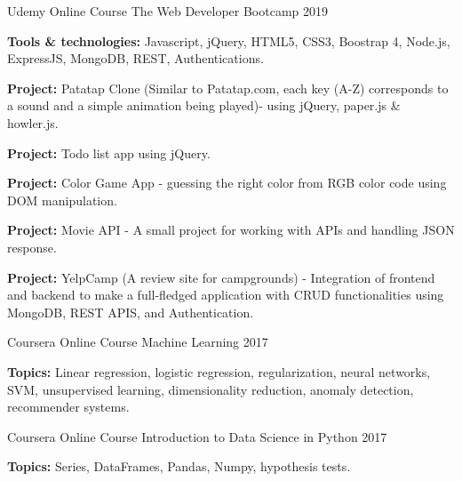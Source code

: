 


\begin{cventries}

\cventry
{Udemy Online Course} %
{The Web Developer Bootcamp} %
{} %
{2019} %
{ %
\begin{cvitems}
\item {\textbf{Tools \& technologies:} Javascript, jQuery, HTML5, CSS3, Boostrap 4, Node.js, ExpressJS, MongoDB, REST, Authentications. }
\item {\textbf{Project:} Patatap Clone (Similar to Patatap.com, each key (A-Z) corresponds to a sound and a simple animation being played)- using jQuery, paper.js \& howler.js.}
\item{\textbf{Project:} Todo list app using jQuery.}
\item{\textbf{Project:} Color Game App - guessing the right color from RGB color code using DOM manipulation.}
\item{\textbf{Project:} Movie API - A small project for working with APIs and handling JSON response.}
\item{\textbf{Project:} YelpCamp (A review site for campgrounds) - Integration of frontend and backend to make a full-fledged application with CRUD functionalities using MongoDB, REST APIS, and Authentication.\\}
\end{cvitems}
}
\cventry
{Coursera Online Course} %
{Machine Learning} %
{} %
{2017} %
{ %
\begin{cvitems}
\item {\textbf{Topics:} Linear regression, logistic regression, regularization, neural networks, SVM, unsupervised learning, dimensionality reduction, anomaly detection, recommender systems.\\ }
\end{cvitems}
}

\cventry
{Coursera Online Course} %
{Introduction to Data Science in Python} %
{} %
{2017} %
{ %
\begin{cvitems}
\item {\textbf{Topics:} Series, DataFrames, Pandas, Numpy, hypothesis tests. }
\end{cvitems}
}



\end{cventries}